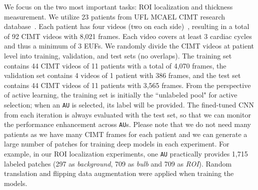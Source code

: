 We focus on the two most important tasks: ROI localization and thickness measurement. We utilize 23 patients from UFL MCAEL CIMT research database~\citep{hurst2010incidence}. Each patient has four videos (two on each side)~\citep{stein2008use}, resulting in a total of 92 CIMT videos with 8,021 frames. Each video covers at least 3 cardiac cycles and thus a minimum of 3 EUFs. We randomly divide the CIMT videos at patient level into training, validation, and test sets (no overlaps). The training set contains 44 CIMT videos of 11 patients with a total of 4,070 frames, the validation set contains  4 videos of 1 patient with 386 frames, and the test set contains 44 CIMT videos of 11 patients with 3,565 frames. From the perspective of active learning, the training set is initially the ``unlabeled pool" for active selection; when an \texttt{AU} is selected, its label will be provided. The fined-tuned CNN from each iteration is always evaluated with the test set, so that we can monitor the performance enhancement across \texttt{AU}s. Please note that we do not need many patients as we have many CIMT frames for each patient and we can generate a large number of patches for training deep models in each experiment. For example, in our ROI localization experiments, one \texttt{AU} practically provides 1,715 labeled patches (297 as {\em background}, 709 as {\em bulb} and 709 as {\em ROI}). Random translation and flipping data augmentation were applied when training the models.